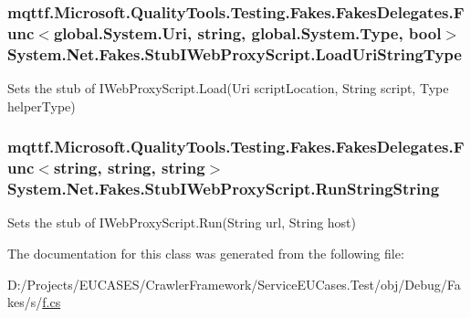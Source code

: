 \hypertarget{class_system_1_1_net_1_1_fakes_1_1_stub_i_web_proxy_script_a7223581339abe1dec30faee6dd8208ec}{
\subsubsection[{Load\-Uri\-String\-Type}]{\setlength{\rightskip}{0pt plus 5cm}mqttf.\-Microsoft.\-Quality\-Tools.\-Testing.\-Fakes.\-Fakes\-Delegates.\-Func$<$global.\-System.\-Uri, string, global.\-System.\-Type, bool$>$ System.\-Net.\-Fakes.\-Stub\-I\-Web\-Proxy\-Script.\-Load\-Uri\-String\-Type}}\label{class_system_1_1_net_1_1_fakes_1_1_stub_i_web_proxy_script_a7223581339abe1dec30faee6dd8208ec}


Sets the stub of I\-Web\-Proxy\-Script.\-Load(\-Uri script\-Location, String script, Type helper\-Type)

\hypertarget{class_system_1_1_net_1_1_fakes_1_1_stub_i_web_proxy_script_aa947d6fe05afd080240d2bc1bef7bc66}{
\subsubsection[{Run\-String\-String}]{\setlength{\rightskip}{0pt plus 5cm}mqttf.\-Microsoft.\-Quality\-Tools.\-Testing.\-Fakes.\-Fakes\-Delegates.\-Func$<$string, string, string$>$ System.\-Net.\-Fakes.\-Stub\-I\-Web\-Proxy\-Script.\-Run\-String\-String}}\label{class_system_1_1_net_1_1_fakes_1_1_stub_i_web_proxy_script_aa947d6fe05afd080240d2bc1bef7bc66}


Sets the stub of I\-Web\-Proxy\-Script.\-Run(\-String url, String host)



The documentation for this class was generated from the following file\-:\begin{DoxyCompactItemize}
\item 
D\-:/\-Projects/\-E\-U\-C\-A\-S\-E\-S/\-Crawler\-Framework/\-Service\-E\-U\-Cases.\-Test/obj/\-Debug/\-Fakes/s/\hyperlink{s_2f_8cs}{f.\-cs}\end{DoxyCompactItemize}
